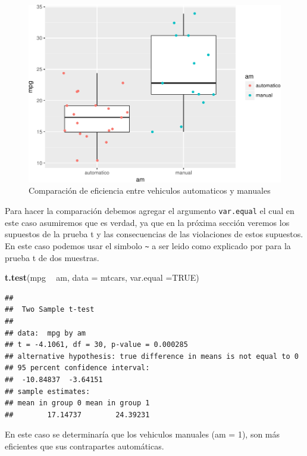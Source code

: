 \documentclass[]{article}
\newenvironment{Shaded}{\begin{snugshade}}{\end{snugshade}}
\newcommand{\KeywordTok}[1]{\textcolor[rgb]{0.13,0.29,0.53}{\textbf{#1}}}
\newcommand{\DataTypeTok}[1]{\textcolor[rgb]{0.13,0.29,0.53}{#1}}
\newcommand{\StringTok}[1]{\textcolor[rgb]{0.31,0.60,0.02}{#1}}
\newcommand{\OtherTok}[1]{\textcolor[rgb]{0.56,0.35,0.01}{#1}}
\newcommand{\OperatorTok}[1]{\textcolor[rgb]{0.81,0.36,0.00}{\textbf{#1}}}
\newcommand{\NormalTok}[1]{#1}
\begin{document}
\begin{figure}
\centering
\includegraphics{Guia5_files/figure-latex/unnamed-chunk-2-1.pdf}
\caption{Comparación de eficiencia entre vehiculos automaticos y
manuales}
\end{figure}

Para hacer la comparación debemos agregar el argumento
\texttt{var.equal} el cual en este caso asumiremos que es verdad, ya que
en la próxima sección veremos los supuestos de la prueba t y las
consecuencias de las violaciones de estos supuestos. En este caso
podemos usar el simbolo \texttt{\textasciitilde{}} a ser leido como
explicado por para la prueba t de dos muestras.

\begin{Shaded}
\begin{Highlighting}[]
\KeywordTok{t.test}\NormalTok{(mpg }\OperatorTok{~}\StringTok{ }\NormalTok{am, }\DataTypeTok{data =}\NormalTok{ mtcars, }\DataTypeTok{var.equal =}\OtherTok{TRUE}\NormalTok{)}
\end{Highlighting}
\end{Shaded}

\begin{verbatim}
## 
##  Two Sample t-test
## 
## data:  mpg by am
## t = -4.1061, df = 30, p-value = 0.000285
## alternative hypothesis: true difference in means is not equal to 0
## 95 percent confidence interval:
##  -10.84837  -3.64151
## sample estimates:
## mean in group 0 mean in group 1 
##        17.14737        24.39231
\end{verbatim}

En este caso se determinaría que los vehiculos manuales (am = 1), son
más eficientes que sus contrapartes automáticas.
\end{document}

